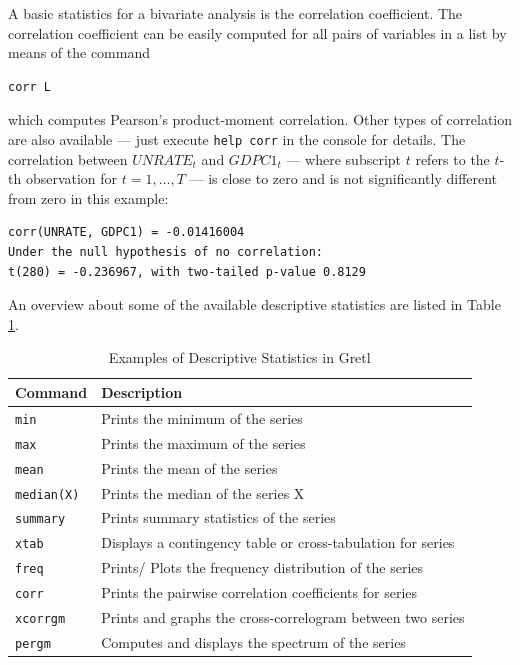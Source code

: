 \documentclass[11pt]{article}
\begin{document}
A basic statistics for a bivariate analysis is the correlation coefficient. The correlation coefficient can be easily computed for all pairs of variables in a list by means of the command
\begin{Verbatim}[baselinestretch=0.75, fontsize=\small]
corr L
\end{Verbatim}
which computes Pearson's product-moment correlation. Other types of correlation %
are also available --- just execute \texttt{help corr} in the console for details. The correlation between $UNRATE_t$ and $GDPC1_t$ --- where subscript $ t $ refers to the $ t $-th observation for $ t=1,\ldots, T $ --- is close to zero and is not significantly different from zero in this example:
\begin{Verbatim}[baselinestretch=0.75, fontsize=\small]
corr(UNRATE, GDPC1) = -0.01416004
Under the null hypothesis of no correlation:
t(280) = -0.236967, with two-tailed p-value 0.8129
\end{Verbatim}

An overview about some of the available descriptive statistics are listed in Table \ref{tab:descriptive}.

\begin{table}[!h]
	\centering
	\footnotesize
	\begin{tabular}{ll}
		\hline
		Command & Description \\ 
		\hline 
		\texttt{min} & Prints the minimum of the series \\
		\texttt{max} & Prints the maximum of the series \\
		\texttt{mean} & Prints the mean of the series \\
		\texttt{median(X)} & Prints the median of the series X \\
		\texttt{summary} & Prints summary statistics of the series \\
		\texttt{xtab} & Displays a contingency table or cross-tabulation for series\\ 
		\texttt{freq} & Prints/ Plots the frequency distribution of the series \\
		\texttt{corr} & Prints the pairwise correlation coefficients for series\\
		\texttt{xcorrgm} & Prints and graphs the cross-correlogram between two series \\
		\texttt{pergm} & Computes and displays the spectrum of the series \\
		\hline 
	\end{tabular}
	\caption{Examples of Descriptive Statistics in Gretl}
	\label{tab:descriptive}
\end{table}
\end{document}
